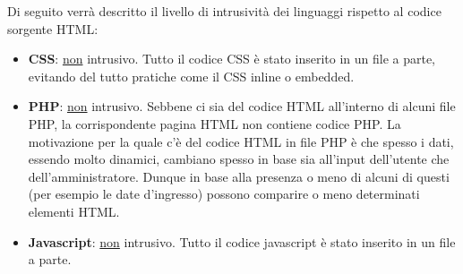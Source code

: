 Di seguito verrà descritto il livello di intrusività dei linguaggi rispetto al codice sorgente HTML:
\begin{itemize}
    \item \textbf{CSS}: \underline{non} intrusivo. Tutto il codice CSS è stato inserito in un file a parte, evitando del tutto pratiche come il
    CSS inline o embedded.
    \item \textbf{PHP}: \underline{non} intrusivo. Sebbene ci sia del codice HTML all'interno di alcuni file PHP, la corrispondente
    pagina HTML non contiene codice PHP. La motivazione per la quale c'è del codice HTML in file PHP è che spesso i dati, essendo molto dinamici,
    cambiano spesso in base sia all'input dell'utente che dell'amministratore. Dunque in base alla presenza o meno di alcuni di questi 
    (per esempio le date d'ingresso) possono comparire o meno determinati elementi HTML.
    \item \textbf{Javascript}: \underline{non} intrusivo. Tutto il codice javascript è stato inserito in un file a parte.
\end{itemize}